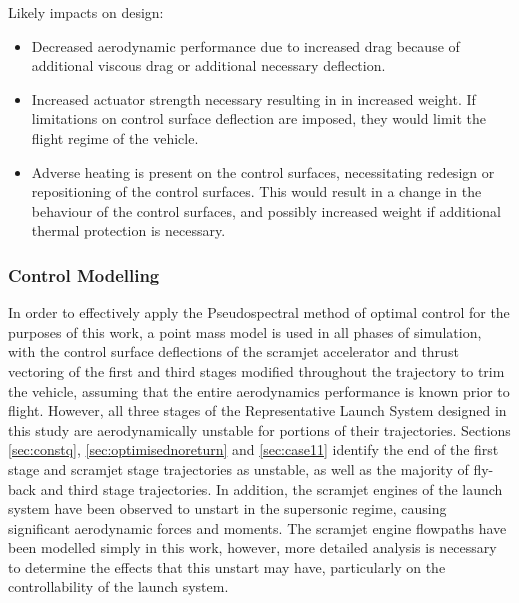 
Likely impacts on design:
\begin{itemize}[noitemsep,topsep=0pt]
	\item Decreased aerodynamic performance due to increased drag because of additional viscous drag or additional necessary deflection.
	\item Increased actuator strength necessary resulting in in increased weight. If limitations on control surface deflection are imposed, they would limit the flight regime of the vehicle. 
	\item Adverse heating is present on the control surfaces, necessitating redesign or repositioning of the control surfaces. This would result in a change in the behaviour of the control surfaces, and possibly increased weight if additional thermal protection is necessary.
\end{itemize}


\subsubsection{Control Modelling}
In order to effectively apply the Pseudospectral method of optimal control for the purposes of this work, a point mass model is used in all phases of simulation, with the control surface deflections of the scramjet accelerator and thrust vectoring of the first and third stages modified throughout the trajectory to trim the vehicle, assuming that the entire aerodynamics performance is known prior to flight. However, all three stages of the Representative Launch System designed in this study are aerodynamically unstable for portions of their trajectories. Sections \ref{sec:constq}, \ref{sec:optimisednoreturn} and \ref{sec:case11}  identify the end of the first stage and scramjet stage trajectories as unstable, as well as the majority of fly-back and third stage trajectories. In addition, the scramjet engines of the launch system have been observed to unstart in the supersonic regime, causing significant aerodynamic forces and moments. The scramjet engine flowpaths have been modelled simply in this work, however, more detailed analysis is necessary to determine the effects that this unstart may have, particularly on the controllability of the launch system. 

